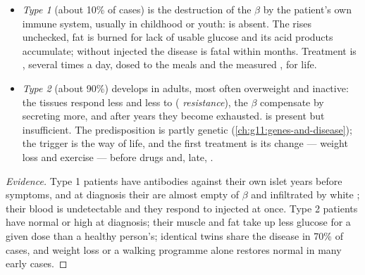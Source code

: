 \begin{proposition}\label{prop:g12:glucose-and-diabetes:types}
\begin{itemize}
  \item \emph{Type 1 } (about 10\% of cases) is the
        destruction of the $\beta$  by the patient's own immune
        system, usually in childhood or youth:  is absent. The
         rises unchecked, fat is burned for lack of usable
        glucose and its acid products accumulate; without injected
         the disease is fatal within months. Treatment is
        , several times a day, dosed to the meals and the
        measured , for life.
  \item \emph{Type 2 } (about 90\%) develops in adults, most
        often overweight and inactive: the tissues respond less and
        less to  (\emph{ resistance}), the $\beta$
         compensate by secreting more, and after years they
        become exhausted.  is present but insufficient. The
        predisposition is partly genetic
        (\cref{ch:g11:genes-and-disease}); the trigger is the way of
        life, and the first treatment is its change --- weight loss and
        exercise --- before drugs and, late, .
\end{itemize}
\end{proposition}
\begin{proof}[Evidence]
Type 1 patients have antibodies against their own islet  years
before symptoms, and at diagnosis their  are almost empty of
$\beta$  and infiltrated by white ; their blood  is
undetectable and they respond to injected  at once. Type 2
patients have normal or high  at diagnosis; their muscle and
fat  take up less glucose for a given  dose than a healthy
person's; identical twins share the disease in 70\% of cases, and
weight loss or a walking programme alone restores normal  in
many early cases.
\end{proof}

